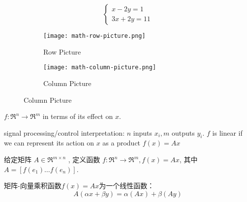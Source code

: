 \begin{example}
    \label{exm: row-column-picture}
    \begin{equation}\left\{\begin{matrix} 
        
        x - 2y=1 \\  
        3x+2y=11 
      \end{matrix}\right. \end{equation}




   
\begin{figure}[htbp]
        \caption{Row Picture and Column Picture for \ref{exm: row-column-picture}}
    \begin{subfigure}[b]{0.8\textwidth}
        \centering
        \caption{Row Picture}
    \texttt{[image: math-row-picture.png]}
    \end{subfigure}

   
    \begin{subfigure}[b]{0.8\textwidth}
        \centering
        \caption{Column Picture}
    \texttt{[image: math-column-picture.png]}
    \end{subfigure}
\end{figure}
\end{example}

$ f: \mathfrak{R}^{n} \rightarrow \mathfrak{R}^{m} $ in terms of its effect on $ x $. 

signal processing/control interpretation: $ n $ inputs $ x_{i}, m $ outputs $ y_{i} $. $ f $ is linear if we can represent its action on $ x $ as a product $ f(x)=A x $

\begin{definition}[矩阵-向量乘积函数 $f(x)=A x$]
    给定矩阵 $ A \in \mathfrak{R}^{m \times n} $ , 定义函数 $ f: \mathfrak{R}^{n} \rightarrow \mathfrak{R}^{m}, f(x)=A x $, 其中 $ A=\left[f\left(e_{1}\right) \ldots f\left(e_{n}\right)\right] $.
    
\end{definition}

\begin{theorem}
    矩阵-向量乘积函数$f(x)=A x$为一个线性函数： \begin{equation} A(\alpha x+\beta y)=\alpha(A x)+\beta(A y) \end{equation}
\end{theorem}

